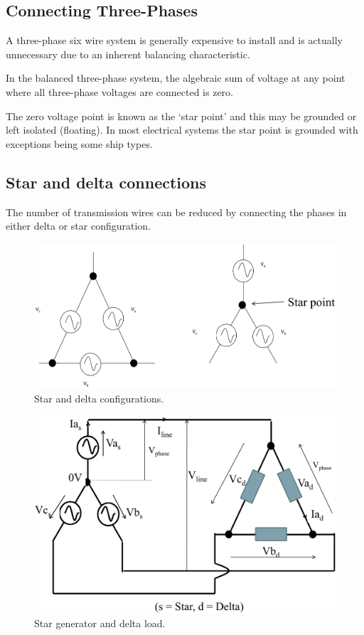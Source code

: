 \subsection{Connecting Three-Phases}
A three-phase six wire system is generally expensive to install and is actually unnecessary due to an inherent balancing characteristic.

In the balanced three-phase system, the algebraic sum of voltage at any point where all three-phase voltages are connected is zero.

The zero voltage point is known as the `star point' and this may be grounded or left isolated (floating). In most electrical systems the star point is grounded with exceptions being some ship types.
\subsection{Star and delta connections}
The number of transmission wires can be reduced by connecting the phases in either delta or star configuration.
\begin{figure}[H]
	\centering
	\includegraphics[width = \textwidth]{./img/figure7.png}
	\caption{Star and delta configurations.}
\end{figure}
\begin{figure}[H]
	\centering
	\includegraphics[width = \textwidth]{./img/figure8.png}
	\caption{Star generator and delta load.}
\end{figure}
